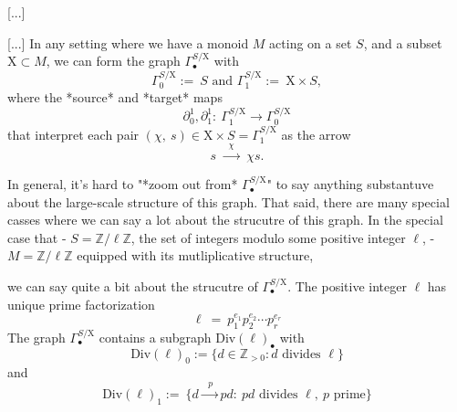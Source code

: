 \documentclass[11pt, a4paper]{article}
\newcommand{\Chi}{\mathrm{X}}
\begin{document}
\begin{section}{[...]}

\begin{subsection}{[...]}
In any setting where we have a monoid $M$ acting on a set $S$, and a subset $\Chi\subset M$, we can form the graph $\Gamma^{S/\Chi}_{\bullet}$ with
$$
\Gamma^{S/\Chi}_{0}:=\ S\text{\ \ \ \ \ \ and\ \ \ \ \ \ }\Gamma^{S/\Chi}_{1}:=\ \Chi\times S,
$$
where the *source* and *target* maps $$\partial^{1}_0,\partial^{1}_1:\ \Gamma^{S/\Chi}_1\!\!\longrightarrow\Gamma^{S/\Chi}_{0}$$ that interpret each pair $(\chi,\ s)\in \Chi\times S=\Gamma^{S/\Chi}_1$ as the arrow $$s\ \!\xrightarrow{\ \ \ \chi\ \ \ }\ \!\chi s.$$

In general, it's hard to "*zoom out from* $\Gamma^{S/\Chi}_{\bullet}$" to say anything substantuve about the large-scale structure of this graph. That said, there are many special casses where we can say a lot about the strucutre of this graph. In the special case that 
- $S=\mathbb{Z}/\ell\mathbb{Z}$, the set of integers modulo some positive integer $\ell$,
- $M=\mathbb{Z}/\ell\mathbb{Z}$ equipped with its mutliplicative structure,

we can say quite a bit about the strucutre of $\Gamma^{S/\Chi}_{\bullet}$. The positive integer $\ell$ has unique prime factorization $$\ell\ =\ p_{1}^{e_1}p_{2}^{e_2}\cdots p_{r}^{e_r}$$ The graph $\Gamma^{S/\Chi}_{\bullet}$ contains a subgraph $\text{Div}(\ell)_{\bullet}$ with $$\text{Div}(\ell)_{0}:=\{d\in\mathbb{Z}_{>0}:d\text{\ divides\ }\ell\}$$ and $$\text{Div}(\ell)_{1}:=\ \{d\xrightarrow{\ \ \ p\ \ }pd:\ pd\text{\ divides\ }\ell,\ p\text{\ prime}\}$$
\end{subsection}
\end{section}




\end{document}
